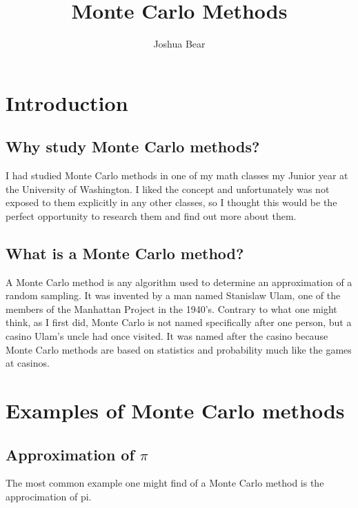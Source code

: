 \documentclass{article}
\title{Monte Carlo Methods}
\author{Joshua Bear}
\date{}
\begin{document}
\maketitle

\pagebreak
\tableofcontents
\pagebreak

\section{Introduction}

\subsection{Why study Monte Carlo methods?}

\hspace{4ex} I had studied Monte Carlo methods in one of my math classes my Junior year at the University of Washington. I liked the concept and unfortunately was not exposed to them explicitly in any other classes, so I thought this would be the perfect opportunity to research them and find out more about them. \\

\subsection{What is a Monte Carlo method?}

\hspace{4ex} A Monte Carlo method is any algorithm used to determine an approximation of a random sampling. It was invented by a man named Stanislaw Ulam, one of the members of the Manhattan Project in the 1940's. Contrary to what one might think, as I first did, Monte Carlo is not named specifically after one person, but a casino Ulam's uncle had once visited. It was named after the casino because Monte Carlo methods are based on statistics and probability much like the games at casinos. \\

\section{Examples of Monte Carlo methods}

\subsection{Approximation of $\pi$}

\hspace{4ex} The most common example one might find of a Monte Carlo method is the approcimation of pi.
\end{document}
